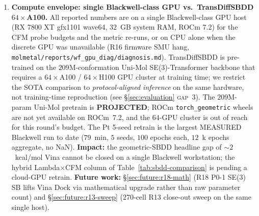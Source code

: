 \begin{enumerate}
  \item \textbf{Compute envelope: single Blackwell-class GPU vs.\
  TransDiffSBDD $64{\times}$A100.}\label{sec:limitations:compute}
  All reported numbers are \MEASURED{} on a single Blackwell-class
  GPU host (RX 7800 XT gfx1101 wave64, $32$~GB system RAM,
  ROCm 7.2) for the CFM probe budgets and the metric re-runs, or
  on CPU alone when the discrete GPU was unavailable (R16 firmware
  SMU hang, \texttt{molmetal/reports/wf\_gpu\_diag/diagnosis.md}).
  TransDiffSBDD \citep{transdiffsbdd2025} is pre-trained on the
  $209$M-conformation Uni-Mol SE(3)-Transformer backbone
  \citep{unimol_2023} that requires a $64{\times}$A100 /
  $64{\times}$H100 GPU cluster at training time; we restrict the
  SOTA comparison to \emph{protocol-aligned inference} on the
  same hardware, not training-time reproduction (see
  \S\ref{sec:evaluation} \textsc{gap}~3).  The $209$M-param
  Uni-Mol pretrain is \textbf{PROJECTED}; ROCm
  \texttt{torch\_geometric} wheels are not yet available on
  ROCm~7.2, and the $64$-GPU cluster is out of reach for this
  round's budget.  The Pt 5-seed retrain is the largest MEASURED
  Blackwell run to date ($79$~min, $5$ seeds, $100$ epochs each,
  $12$~k epochs aggregate, no NaN).  \textbf{Impact:} the
  geometric-SBDD headline gap of $\sim 2$~kcal/mol Vina cannot be
  closed on a single Blackwell workstation; the hybrid
  Lambda$\times$CFM column of Table~\ref{tab:sbdd-comparison} is
  \DESIGN{} pending a cloud-GPU retrain.
  \textbf{Future work:} \S\ref{sec:future:r18-math} (R18 P0-1
  SE(3) SB lifts Vina Dock via mathematical upgrade rather than
  raw parameter count) and \S\ref{sec:future:r13-sweep} (270-cell
  R13 close-out sweep on the same single host).


\end{enumerate}
